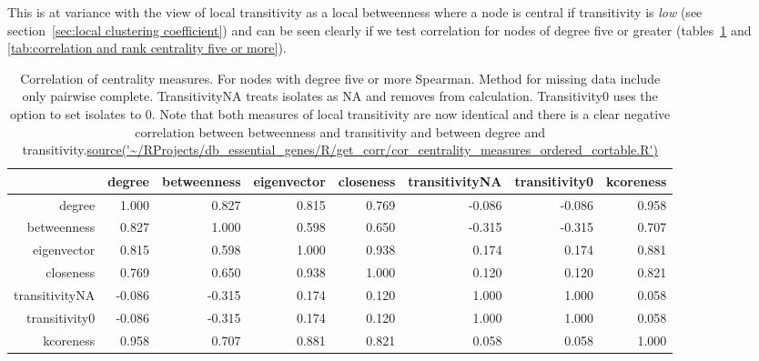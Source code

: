 

  This is at variance with the view of local transitivity as a local betweenness where a node is central if transitivity is \textit{low} (see section~\ref{sec:local clustering coefficient}) and can be seen clearly if we test correlation for nodes of degree five or greater (tables~\ref{tab:Correlation of centrality measures 2 transitvities deg five or more} and \ref{tab:correlation and rank centrality five or more}).

\begin{table}[ht]
\centering
\begin{adjustbox}{width = \textwidth}
\begin{tabular}{rrrrrrrr}
  \hline
 & degree & betweenness & eigenvector & closeness & transitivityNA & transitivity0 & kcoreness \\ 
  \hline
degree & 1.000 & 0.827 & 0.815 & 0.769 & -0.086 & -0.086 & 0.958 \\ 
  betweenness & 0.827 & 1.000 & 0.598 & 0.650 & -0.315 & -0.315 & 0.707 \\ 
  eigenvector & 0.815 & 0.598 & 1.000 & 0.938 & 0.174 & 0.174 & 0.881 \\ 
  closeness & 0.769 & 0.650 & 0.938 & 1.000 & 0.120 & 0.120 & 0.821 \\ 
  transitivityNA & -0.086 & -0.315 & 0.174 & 0.120 & 1.000 & 1.000 & 0.058 \\ 
  transitivity0 & -0.086 & -0.315 & 0.174 & 0.120 & 1.000 & 1.000 & 0.058 \\ 
  kcoreness & 0.958 & 0.707 & 0.881 & 0.821 & 0.058 & 0.058 & 1.000 \\ 
   \hline
\end{tabular}
\end{adjustbox}
\caption[Correlation of centrality measures for nodes $k>=5$]{Correlation of centrality measures. For nodes with degree five or more Spearman. Method for missing data include only pairwise complete. TransitivityNA treats isolates as NA and removes from calculation. Transitivity0 uses the option to set isolates to 0. Note that both measures of local transitivity are now identical and there is a clear negative correlation between betweenness and transitivity and between degree and transitivity.\url{source('~/RProjects/db_essential_genes/R/get_corr/cor_centrality_measures_ordered_cortable.R')}} 
\label{tab:Correlation of centrality measures 2 transitvities deg five or more}
\end{table}

